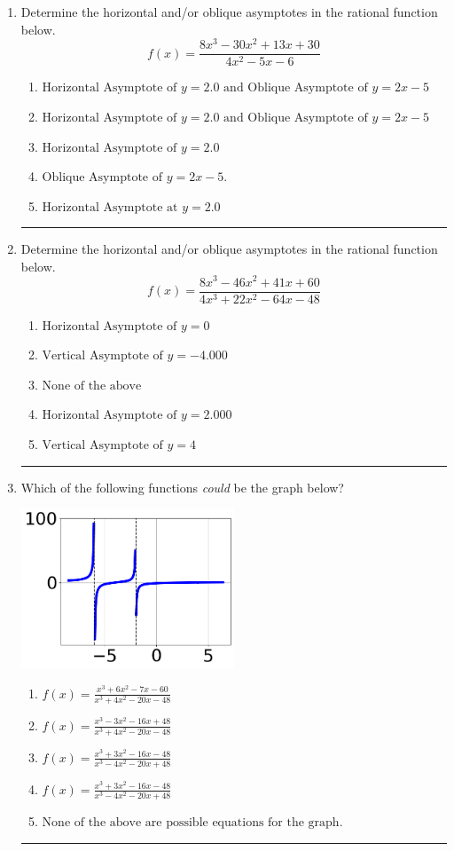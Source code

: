 \documentclass[14pt]{extbook}
\newcommand{\litem}[1]{\item#1\hspace*{-1cm}\rule{\textwidth}{0.4pt}}
\begin{document}
\begin{enumerate}
\litem{
Determine the horizontal and/or oblique asymptotes in the rational function below.\[ f(x) = \frac{8x^{3} -30 x^{2} +13 x + 30}{4x^{2} -5 x -6} \]\begin{enumerate}[label=\Alph*.]
\item \( \text{Horizontal Asymptote of } y = 2.0 \text{ and Oblique Asymptote of } y = 2x -5 \)
\item \( \text{Horizontal Asymptote of } y = 2.0 \text{ and Oblique Asymptote of } y = 2x -5 \)
\item \( \text{Horizontal Asymptote of } y = 2.0  \)
\item \( \text{Oblique Asymptote of } y = 2x -5. \)
\item \( \text{Horizontal Asymptote at } y = 2.0 \)

\end{enumerate} }
\litem{
Determine the horizontal and/or oblique asymptotes in the rational function below.\[ f(x) = \frac{8x^{3} -46 x^{2} +41 x + 60}{4x^{3} +22 x^{2} -64 x -48} \]\begin{enumerate}[label=\Alph*.]
\item \( \text{Horizontal Asymptote of } y = 0  \)
\item \( \text{Vertical Asymptote of } y = -4.000  \)
\item \( \text{None of the above} \)
\item \( \text{Horizontal Asymptote of } y = 2.000  \)
\item \( \text{Vertical Asymptote of } y = 4  \)

\end{enumerate} }
\litem{
Which of the following functions \textit{could} be the graph below?
\begin{center}
    \includegraphics[width=0.5\textwidth]{../Figures/identifyGraphOfRationalFunctionC.png}
\end{center}
\begin{enumerate}[label=\Alph*.]
\item \( f(x)=\frac{x^{3} +6 x^{2} -7 x -60}{x^{3} +4 x^{2} -20 x -48} \)
\item \( f(x)=\frac{x^{3} -3 x^{2} -16 x + 48}{x^{3} +4 x^{2} -20 x -48} \)
\item \( f(x)=\frac{x^{3} +3 x^{2} -16 x -48}{x^{3} -4 x^{2} -20 x + 48} \)
\item \( f(x)=\frac{x^{3} +3 x^{2} -16 x -48}{x^{3} -4 x^{2} -20 x + 48} \)
\item \( \text{None of the above are possible equations for the graph.} \)


\end{enumerate}}
\end{enumerate}
\end{document}
